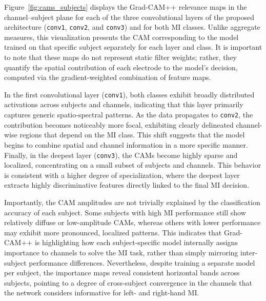 {Figure~\ref{fig:cams_subjects} displays the Grad-CAM++ relevance maps in the channel--subject plane for each of the three convolutional layers of the proposed architecture (\texttt{conv1}, \texttt{conv2}, and \texttt{conv3}) and for both MI classes. Unlike aggregate measures, this visualization presents the CAM corresponding to the model trained on that specific subject separately for each layer and class. It is important to note that these maps do not represent static filter weights; rather, they quantify the spatial contribution of each electrode to the model's decision, computed via the gradient-weighted combination of feature maps.}


{In the first convolutional layer (\texttt{conv1}), both classes exhibit broadly distributed activations across subjects and channels, indicating that this layer primarily captures generic spatio-spectral patterns. As the data propagates to \texttt{conv2}, the contribution becomes noticeably more focal, exhibiting clearly delineated channel-wise regions that depend on the MI class. This shift suggests that the model begins to combine spatial and channel information in a more specific manner. Finally, in the deepest layer (\texttt{conv3}), the CAMs become highly sparse and localized, concentrating on a small subset of subjects and channels. This behavior is consistent with a higher degree of specialization, where the deepest layer extracts highly discriminative features directly linked to the final MI decision.}

{Importantly, the CAM amplitudes are not trivially explained by the classification accuracy of each subject. Some subjects with high MI performance still show relatively diffuse or low-amplitude CAMs, whereas others with lower performance may exhibit more pronounced, localized patterns. This indicates that Grad-CAM++ is highlighting how each subject-specific model internally assigns importance to channels to solve the MI task, rather than simply mirroring inter-subject performance differences. Nevertheless, despite training a separate model per subject, the importance maps reveal consistent horizontal bands across subjects, pointing to a degree of cross-subject convergence in the channels that the network considers informative for left- and right-hand MI.}\\


